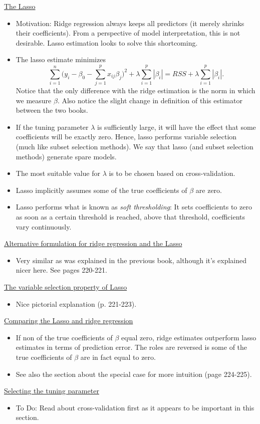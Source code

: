 \underline{The Lasso}
\begin{itemize}
    \item Motivation: Ridge regression always keeps all predictors (it merely shrinks their coefficients). From a perspective of model interpretation, this is not desirable. Lasso estimation looks to solve this shortcoming.
    \item The lasso estimate minimizes
    \begin{equation*}
        \sum_{i=1}^n \bigg( y_i - \beta_0 - \sum_{j=1}^p x_{ij}\beta_j\bigg)^2 + \lambda \sum_{i=1}^p |\beta_i| = RSS + \lambda \sum_{i=1}^p |\beta_i|.
    \end{equation*}
    Notice that the only difference with the ridge estimation is the norm in which we measure $\beta$. Also notice the slight change in definition of this estimator between the two books.
    \item If the tuning parameter $\lambda$ is sufficiently large, it will have the effect that some coefficients will be exactly zero. Hence, lasso performs variable selection (much like subset selection methods). We say that lasso (and subset selection methods) generate spare models.
    \item The most suitable value for $\lambda$ is to be chosen based on cross-validation.
    \item Lasso implicitly assumes some of the true coefficients of $\beta$ are zero.
     \item Lasso performs what is known as \textit{soft thresholding}: It sets coefficients to zero as soon as a certain threshold is reached, above that threshold, coefficients vary continuously.
\end{itemize}

\underline{Alternative formulation for ridge regression and the Lasso}
\begin{itemize}
    \item Very similar as was explained in the previous book, although it's explained nicer here. See pages 220-221.
\end{itemize}

\underline{The variable selection property of Lasso}
\begin{itemize}
    \item Nice pictorial explanation (p. 221-223).
\end{itemize}

\underline{Comparing the Lasso and ridge regression}
\begin{itemize}
    \item If non of the true coefficients of $\beta$ equal zero, ridge estimates outperform lasso estimates in terms of prediction error. The roles are reversed is some of the true coefficients of $\beta$ are in fact equal to zero.
    \item See also the section about the special case for more intuition (page 224-225).
\end{itemize}

\underline{Selecting the tuning parameter}
\begin{itemize}
    \item To Do: Read about cross-validation first as it appears to be important in this section.
\end{itemize}